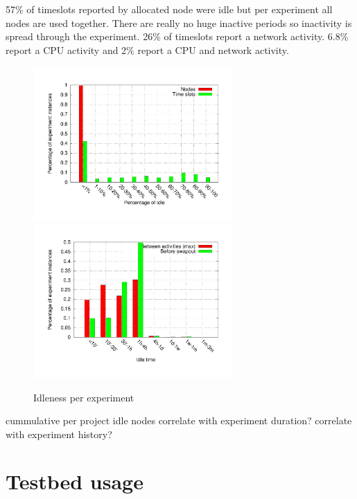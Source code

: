 \documentclass[10pt, twocolumn]{article} %
\begin{document}
57\% of timeslots reported by allocated node were idle but per
experiment all nodes are used together. There are really no huge
inactive periods so inactivity is spread through the experiment. 26\% of
timeslots report a network activity. 6.8\% report a CPU activity and 2\%
report a CPU and network activity.

\begin{figure}[htbp] \begin{center} \includegraphics[width=3in,
type=pdf,ext=.pdf,read=.pdf]{figs/exp.idle.gnu}
\includegraphics[width=3in,
type=pdf,ext=.pdf,read=.pdf]{figs/period.idle.gnu} \caption{Idleness per
experiment} \label{idle} \end{center} \end{figure}


cummulative per project idle nodes correlate with experiment duration?
correlate with experiment history?




\section{Testbed usage}
\end{document}
